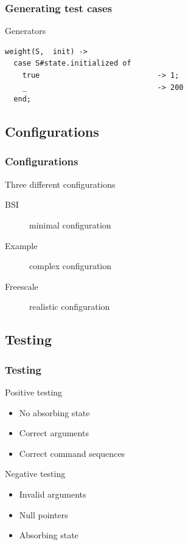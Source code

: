 \documentclass{beamer}
\begin{document}
\begin{frame}[fragile]
        \frametitle{Generating test cases}
           Generators
        \Fontvi
        \begin{lstlisting}[style=erlang]
weight(S,  init) ->
  case S#state.initialized of
    true                           -> 1;
    _                              -> 200
  end;
           \end{lstlisting}
\end{frame}

\subsection{Configurations}

\begin{frame}
  \frametitle{Configurations}
  Three different configurations\\
  \begin{description}
    \item[BSI] minimal configuration
    \item[Example] complex configuration
    \item[Freescale] realistic configuration
  \end{description}
\end{frame}

\subsection{Testing}

\begin{frame}
  \frametitle{Testing}
  \begin{block}{Positive testing}
    \begin{itemize}
      \item No absorbing state
      \item Correct arguments
      \item Correct command sequences
    \end{itemize}
  \end{block}
  \begin{block}{Negative testing}
    \begin{itemize}
      \item Invalid arguments
      \item Null pointers
      \item Absorbing state
    \end{itemize}
  \end{block}
\end{frame}
\end{document}
